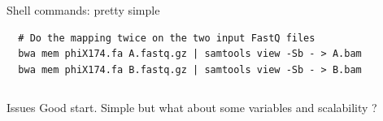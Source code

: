 \documentclass{beamer}
\begin{document}
\begin{frame}
\begin{columns}
\begin{column}[T]{9cm}
\begin{block}{Shell commands: pretty simple}
\begin{lstlisting}
  # Do the mapping twice on the two input FastQ files
  bwa mem phiX174.fa A.fastq.gz | samtools view -Sb - > A.bam
  bwa mem phiX174.fa B.fastq.gz | samtools view -Sb - > B.bam
  \end{lstlisting}                                                      
  \end{block}
 \end{column}
 \end{columns}
 
 \pause
  \begin{alertblock}{Issues}
  Good start. Simple but what about some variables and scalability ?
  \end{alertblock}
 
\end{frame}


\end{document}
